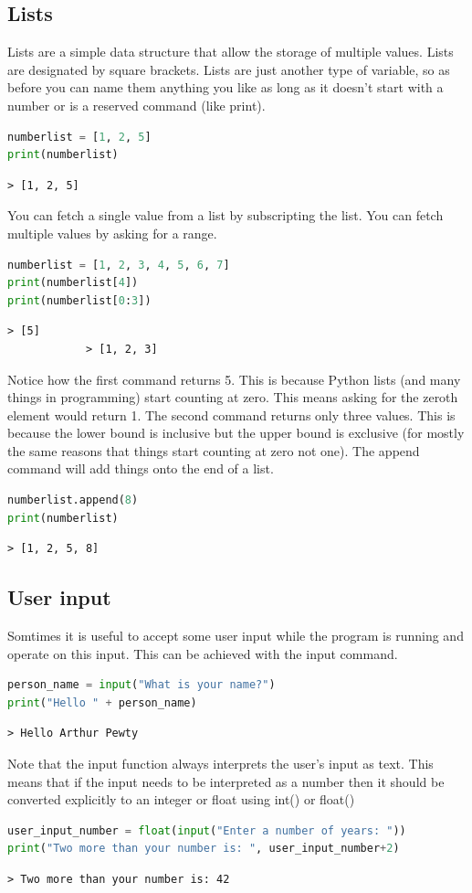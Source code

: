 	\subsection{Lists}
	Lists are a simple data structure that allow the storage of multiple values. Lists are designated by square brackets. Lists are just another type of variable, so as before you can name them anything you like as long as it doesn't start with a number or is a reserved command (like print).
		\begin{lstlisting}[language=Python]
numberlist = [1, 2, 5]
print(numberlist)\end{lstlisting}
		\begin{verbatim}> [1, 2, 5]\end{verbatim}
		You can fetch a single value from a list by subscripting the list. You can fetch multiple values by asking for a range.
		
		\begin{lstlisting}[language=Python]
numberlist = [1, 2, 3, 4, 5, 6, 7]
print(numberlist[4])
print(numberlist[0:3])\end{lstlisting}
		\begin{verbatim}> [5]
			> [1, 2, 3]
		\end{verbatim}
		Notice how the first command returns 5. This is because Python lists (and many things in programming) start counting at zero. This means asking for the zeroth element would return 1.
		The second command returns only three values. This is because the lower bound is inclusive but the upper bound is exclusive (for mostly the same reasons that things start counting at zero not one). 
		The append command will add things onto the end of a list.
		\begin{lstlisting}[language=Python]
numberlist.append(8)
print(numberlist)	\end{lstlisting}
		\begin{verbatim}> [1, 2, 5, 8]\end{verbatim}
	\subsection{User input}
		Somtimes it is useful to accept some user input while the program is running and operate on this input. This can be achieved with the input command.
		\begin{lstlisting}[language=Python]
person_name = input("What is your name?")
print("Hello " + person_name)\end{lstlisting}
		\begin{verbatim}> Hello Arthur Pewty\end{verbatim}
		Note that the input function always interprets the user's input as text. This means that if the input needs to be interpreted as a number then it should be converted explicitly to an integer or float using int() or float()
		\begin{lstlisting}[language=Python]
user_input_number = float(input("Enter a number of years: "))
print("Two more than your number is: ", user_input_number+2)\end{lstlisting}
		\begin{verbatim}> Two more than your number is: 42\end{verbatim}

